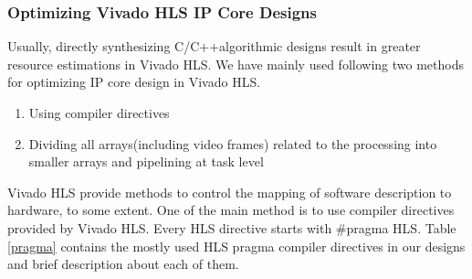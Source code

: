 \documentclass[12pt,a4paper]{report}
\begin{document}
\subsubsection{Optimizing Vivado HLS IP Core Designs}
Usually, directly synthesizing C/C++algorithmic designs result in greater resource estimations in Vivado HLS. We have mainly used following two methods for optimizing IP core design in Vivado HLS.
\begin{enumerate}
\item Using compiler directives
\item Dividing all arrays(including video frames) related to the processing into smaller arrays and pipelining at task level
\end{enumerate} 
Vivado HLS provide methods to control the mapping of software description to hardware, to some extent. One of the main method is to use compiler directives provided by Vivado HLS. Every HLS directive starts with \#pragma HLS. Table \ref{pragma} contains the mostly used HLS pragma compiler directives in our designs and brief description about each of them.
\end{document}
